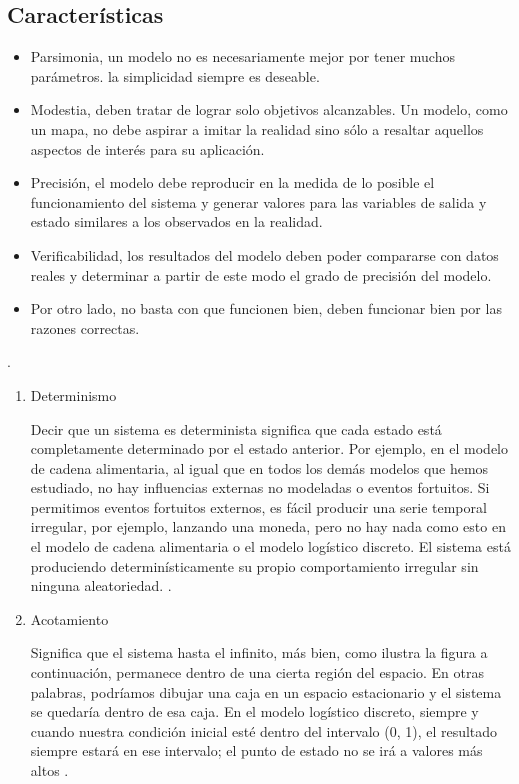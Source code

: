 \documentclass[11pt, letterpaper, spanish]{article}
\begin{document}
{\subsection{Características}
\begin{itemize}
    \item Parsimonia, un modelo no es necesariamente mejor por tener muchos parámetros. la simplicidad siempre es deseable.
    \item Modestia, deben tratar de lograr solo objetivos alcanzables. Un modelo, como un mapa, no debe aspirar a imitar la realidad sino sólo a resaltar aquellos aspectos de interés para su aplicación.
    \item Precisión, el modelo debe reproducir en la medida de lo posible el funcionamiento del sistema y generar valores para las variables de salida y estado similares a los observados en la realidad.
    \item Verificabilidad, los resultados del modelo deben poder compararse con datos reales y determinar a partir de este modo el grado de precisión del modelo.
    \item Por otro lado, no basta con que funcionen bien, deben funcionar bien por las razones correctas.
    \end{itemize}.
    \begin{enumerate}
        \item Determinismo
    \par{Decir que un sistema es determinista significa que cada estado está completamente determinado por el estado anterior. 
    Por ejemplo, en el modelo de cadena alimentaria, al igual que en todos los demás modelos que hemos estudiado, no hay influencias externas no modeladas o eventos fortuitos. Si permitimos eventos fortuitos externos, es fácil producir una serie temporal irregular, por ejemplo, lanzando una moneda, pero no hay nada como esto en el modelo de cadena alimentaria o el modelo logístico discreto. El sistema está produciendo determinísticamente su propio comportamiento irregular sin ninguna aleatoriedad. \cite{garfinkel_shevtsov_guo_2017}.}
    \item{Acotamiento}
    \par{Significa que el sistema hasta el infinito, más bien, como ilustra la figura a continuación, permanece dentro de una cierta región del espacio. En otras palabras, podríamos dibujar una caja en un espacio estacionario y el sistema se quedaría dentro de esa caja. En el modelo logístico discreto, siempre y cuando nuestra condición inicial esté dentro del intervalo (0, 1), el resultado siempre estará en ese intervalo; el punto de estado no se irá a valores más altos \cite{garfinkel_shevtsov_guo_2017}.}
    

\end{enumerate}}
\end{document}
